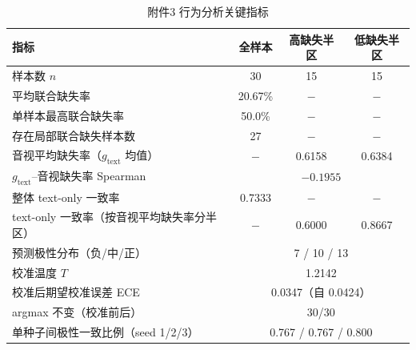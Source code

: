 \begin{table}[htbp]
  \centering\small
  \caption{附件3 行为分析关键指标}
  \label{tab:p2-fj3-behavior}
  \begin{tabularx}{\textwidth}{@{}Xccc@{}}
    \toprule
    指标 & 全样本 & 高缺失半区 & 低缺失半区 \\
    \midrule
    样本数 $n$                                       & 30 & 15 & 15 \\
    平均联合缺失率                                   & 20.67\% & $-$ & $-$ \\
    单样本最高联合缺失率                             & 50.0\%  & $-$ & $-$ \\
    存在局部联合缺失样本数                           & 27 & $-$ & $-$ \\
    音视平均缺失率（$g_{\text{text}}$ 均值）          & $-$ & 0.6158 & 0.6384 \\
    $g_{\text{text}}$--音视缺失率 Spearman           & \multicolumn{3}{c}{$-0.1955$} \\
    整体 text-only 一致率                             & 0.7333 & $-$ & $-$ \\
    text-only 一致率（按音视平均缺失率分半区）        & $-$ & 0.6000 & 0.8667 \\
    \midrule
    预测极性分布（负/中/正）                         & \multicolumn{3}{c}{7 / 10 / 13} \\
    校准温度 $T$                                     & \multicolumn{3}{c}{1.2142} \\
    校准后期望校准误差 ECE                           & \multicolumn{3}{c}{0.0347（自 0.0424）} \\
    argmax 不变（校准前后）                          & \multicolumn{3}{c}{30/30} \\
    单种子间极性一致比例（seed 1/2/3）              & \multicolumn{3}{c}{0.767 / 0.767 / 0.800} \\
    \bottomrule
  \end{tabularx}
  \par \smallskip
  \end{table}